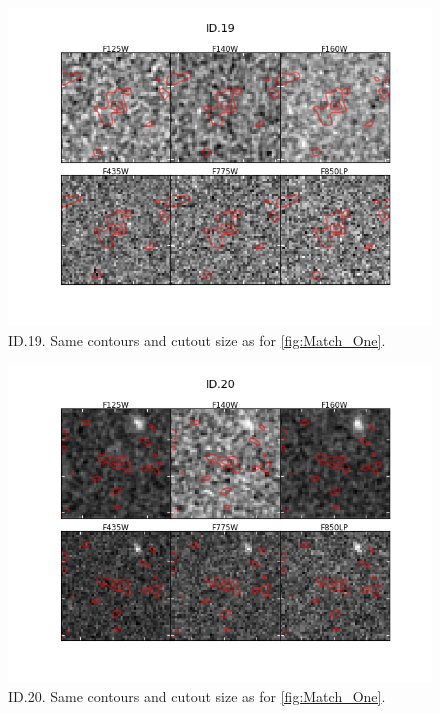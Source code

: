 \begin{figure}[tbp]
\centering \includegraphics[width=160mm]{Matched/ASPECS_Cutout_18.png}
\caption{ID.19. Same contours and cutout size as for \ref{fig:Match_One}.}
\label{fig:Match_Three}
\end{figure}

\begin{figure}[tbp]
\centering \includegraphics[width=160mm]{Matched/ASPECS_Cutout_19.png}
\caption{ID.20. Same contours and cutout size as for \ref{fig:Match_One}.}
\label{fig:Match_Three}
\end{figure}

